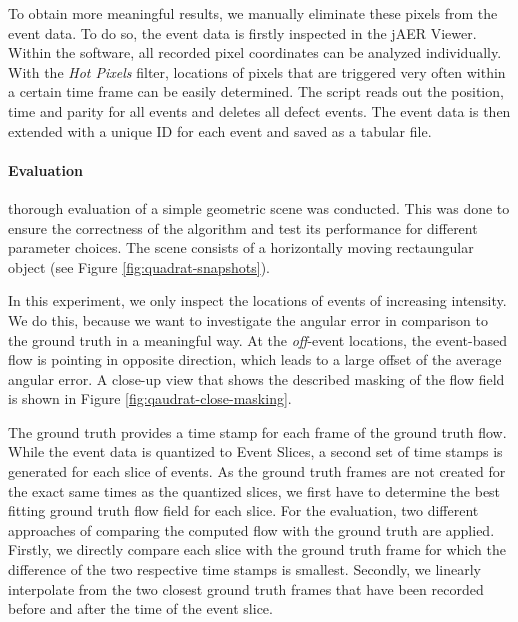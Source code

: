 To obtain more meaningful results, we manually eliminate these pixels from the event data.
To do so, the event data is firstly inspected in the jAER Viewer. 
Within the software, all recorded pixel coordinates can be analyzed individually.
With the \textit{Hot Pixels} filter, locations of pixels that are triggered very often within a certain time frame can be easily determined.
The script reads out the position, time and parity for all events and deletes all defect events.
The event data is then extended with a unique ID for each event and saved as a tabular file.


\paragraph{Evaluation}
 thorough evaluation of a simple geometric scene was conducted.
This was done to ensure the correctness of the algorithm and test its performance for different parameter choices.
The scene consists of a horizontally moving rectaungular object (see Figure \ref{fig:quadrat-snapshots}).


In this experiment, we only inspect the locations of events of increasing intensity.
We do this, because we want to investigate the angular error in comparison to the ground truth in a meaningful way. 
At the \textit{off}-event locations, the event-based flow is pointing in opposite direction, which leads to a large offset of the average angular error. 
A close-up view that shows the described masking of the flow field is shown in Figure \ref{fig:qaudrat-close-masking}.


The ground truth provides a time stamp for each frame of the ground truth flow.
While the event data is quantized to Event Slices, a second set of time stamps is generated for each slice of events.
As the ground truth frames are not created for the exact same times as the quantized slices, we first have to determine the best fitting ground truth flow field for each slice.
For the evaluation, two different approaches of comparing the computed flow with the ground truth are applied.
Firstly, we directly compare each slice with the ground truth frame for which the difference of the two respective time stamps is smallest.
Secondly, we linearly interpolate from the two closest ground truth frames that have been recorded before and after the time of the event slice.


